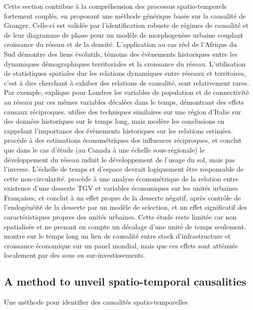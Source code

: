 {}{
Cette section contribue à la compréhension des processus spatio-temporels fortement couplés, en proposant une méthode générique basée sur la causalité de Granger. Celle-ci est validée par l'identification robuste de régimes de causalité et de leur diagramme de phase pour un modèle de morphogenèse urbaine couplant croissance du réseau et de la densité. L'application au cas réel de l'Afrique du Sud démontre des liens évolutifs, témoins des évènements historiques entre les dynamiques démographiques territoriales et la croissance du réseau. L'utilisation de statistiques spatiales dur les relations dynamiques entre réseaux et territoires, c'est à dire cherchant à exhiber des relations de causalité, sont relativement rares. Par exemple, \cite{levinson2008density} explique pour Londres les variables de population et de connectivité au réseau par ces mêmes variables décalées dans le temps, démontrant des effets causaux réciproques. \cite{doi:10.1068/b39089} utilise des techniques similaires sur une région d'Italie sur des données historiques sur le temps long, mais modère les conclusions en rappelant l'importance des évènements historiques sur les relations estimées. \cite{cuthbert2005empirical} procède à des estimations économétriques des influences réciproques, et conclut que dans le cas d'étude (au Canada à une échelle sous-régionale) le développement du réseau induit le développement de l'usage du sol, mais pas l'inverse. L'échelle de temps et d'espace devrait logiquement être responsable de cette non-circularité. \cite{koning:hal-00962384} procède à une analyse économétrique de la relation entre existence d'une desserte TGV et variables économiques sur les unités urbaines Françaises, et conclut à un effet propre de la desserte négatif, après contrôle de l'endogénéité de la desserte par un modèle de selection, et un effet significatif des caractéristiques propres des unités urbaines. Cette étude reste limitée car non spatialisée et ne prenant en compte un décalage d'une unité de temps seulement. \cite{MANC:MANC1073} montre sur le temps long un lien de causalité entre stock d'infrastructure et croissance économique sur un panel mondial, mais que ces effets sont atténués localement par des sous ou sur-investissements.

}




\subsection[Spatio-temporal Causalities][Causalités Spatio-temporelles]{A method to unveil spatio-temporal causalities}{Une méthode pour identifier des causalités spatio-temporelles}


